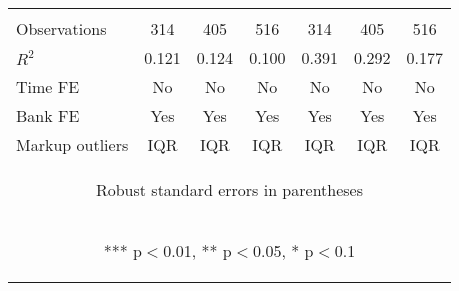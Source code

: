 \documentclass[]{article}
\begin{document}
\begin{center}
\begin{tabular}{lcccccc}
\vspace{4pt} & \begin{footnotesize}\end{footnotesize} & \begin{footnotesize}\end{footnotesize} & \begin{footnotesize}\end{footnotesize} & \begin{footnotesize}\end{footnotesize} & \begin{footnotesize}\end{footnotesize} & \begin{footnotesize}\end{footnotesize} \\
Observations & 314 & 405 & 516 & 314 & 405 & 516 \\
$R^2$ & 0.121 & 0.124 & 0.100 & 0.391 & 0.292 & 0.177 \\
Time FE & No & No & No & No & No & No \\
Bank FE & Yes & Yes & Yes & Yes & Yes & Yes \\
 Markup outliers & IQR & IQR & IQR & IQR & IQR & IQR \\ \hline
\multicolumn{7}{c}{\begin{footnotesize} Robust standard errors in parentheses\end{footnotesize}} \\
\multicolumn{7}{c}{\begin{footnotesize} *** p$<$0.01, ** p$<$0.05, * p$<$0.1\end{footnotesize}} \\
\end{tabular}
\end{center}
\end{document}
